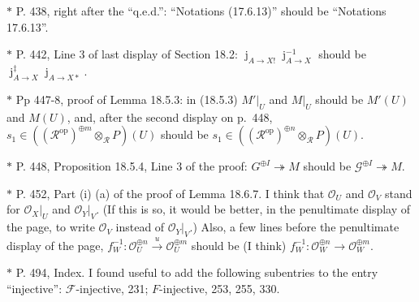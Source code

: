 \documentclass[12pt]{article}
\theoremstyle{remark}
\theoremstyle{definition}
\newcommand{\cc}{\mathcal}
\newcommand{\epi}{\twoheadrightarrow}
\newcommand{\xr}{\xrightarrow}
\DeclareMathOperator{\jj}{j}
\DeclareMathOperator{\op}{op}
\begin{document}
\noindent $*$ P. 438, right after the ``q.e.d.'': ``Notations (17.6.13)'' should be ``Notations 17.6.13''.

\noindent $*$ P. 442, Line 3 of last display of Section 18.2: $\jj_{A\to X!}\jj_{A\to X}^{-1}$ should be $\jj_{A\to X}^\ddagger\jj_{A\to X*}$.

\noindent $*$ Pp 447-8, proof of Lemma 18.5.3: in (18.5.3) $M'|_U$ and $M|_U$ should be $M'(U)$ and $M(U)$, and, after the second display on p.~448, $s_1\in((\cc R^{\op})^{\oplus m}\otimes_{\cc R}P)(U)$ should be $s_1\in((\cc R^{\op})^{\oplus n}\otimes_{\cc R}P)(U)$.

\noindent $*$ P. 448, Proposition 18.5.4, Line 3 of the proof: $G^{\oplus I}\epi M$ should be $\cc G^{\oplus I}\epi M$.

\noindent $*$ P. 452, Part (i) (a) of the proof of Lemma 18.6.7. I think that $\cc O_U$ and $\cc O_V$ stand for $\cc O_X|_U$ and $\cc O_Y|_V$. (If this is so, it would be better, in the penultimate display of the page, to write $\cc O_V$ instead of $\cc O_Y|_V$.) Also, a few lines before the penultimate display of the page, $f_W^{-1}:\cc O_U^{\oplus n}\xr u\cc O_U^{\oplus m}$ should be (I think) $f_W^{-1}:\cc O_W^{\oplus n}\to\cc O_W^{\oplus m}$.

\noindent $*$ P. 494, Index. I found useful to add the following subentries to the entry ``injective'': $\cc F$-injective, 231; $F$-injective, 253, 255, 330.
%
\end{document}
